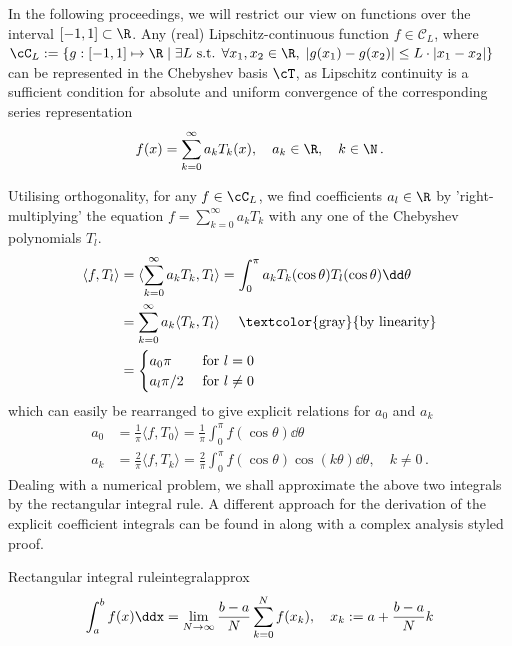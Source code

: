 \documentclass[12pt, a4paper]{article}
\begin{document}
  In the following proceedings, we will restrict our view on functions over the interval $[-1, 1] \subset \R$.
  Any (real) Lipschitz-continuous function $f \in \mathcal{C}_L$, where $\cC_L := \{g: [-1, 1] \mapsto \R \;|\; \exists L \text{ s.t. } \forall x_1, x_2 \in \R, \; |g(x_1) - g(x_2)| \le L \cdot |x_1-x_2|\}$ can be represented in the Chebyshev basis $\cT$, as Lipschitz continuity is a sufficient condition for absolute and uniform convergence of the corresponding series representation
  $$f(x) = \sum_{k=0}^\infty a_k T_k(x), \quad a_k \in \R,\quad k \in \N \,.$$

  Utilising orthogonality, for any $f \in \cC_L$, we find coefficients $a_l \in \R$ by 'right-multiplying' the equation $f = \sum_{k=0}^\infty a_k T_k$ with any one of the Chebyshev polynomials $T_l$.
  \begin{align*}
    \langle f, T_l \rangle & = \langle \sum_{k=0}^\infty a_k T_k, T_l \rangle = \int_0^\pi a_k T_k(\cos \theta) T_l(\cos \theta) \dd\theta \\
                           & = \sum_{k=0}^\infty a_k \langle T_k, T_l \rangle \quad \text{ \textcolor{gray}{by linearity}}                 \\
                           & = \begin{cases}
                                 a_0 \pi   & \text{ for } l = 0    \\
                                 a_l \pi/2 & \text{ for } l \neq 0
                               \end{cases}
  \end{align*}
  which can easily be rearranged to give explicit relations for $a_0$ and $a_k$
  \begin{align*}
    a_0 & = \frac{1}{\pi} \langle f, T_0 \rangle =  \frac{1}{\pi} \int_0^\pi f(\cos \theta) \dd\theta                                   \\
    a_k & = \frac{2}{\pi} \langle f, T_k \rangle = \frac{2}{\pi} \int_0^\pi f(\cos \theta) \cos(k \theta) \dd\theta, \quad k \neq 0 \,.
  \end{align*}
  Dealing with a numerical problem, we shall approximate the above two integrals by the rectangular integral rule.
  A different approach for the derivation of the explicit coefficient integrals can be found in \cite{atap} along with a complex analysis styled proof.

  \begin{theorem}{Rectangular integral rule}{integralapprox}
    $$\int_a^b f(x) \ddx = \lim_{N \rightarrow \infty} \frac{b-a}{N} \sum_{k=0}^N f(x_k), \quad x_k := a + \frac{b-a}{N} k$$
  \end{theorem}
  \cite[128]{bonthuis-cp}
\end{document}
